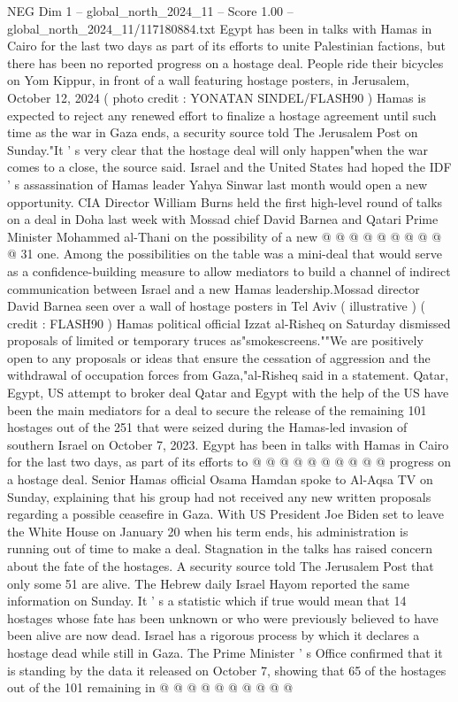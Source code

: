 \begin{textsample}{NEG Dim 1 – global\_north\_2024\_11 – Score 1.00 – global\_north\_2024\_11/117180884.txt}  \label{ex:f1_neg_112}
Egypt has been in talks with Hamas in Cairo for the last two days as part of its efforts to unite Palestinian factions, but there has been no reported progress on a hostage deal.
People ride their bicycles on Yom Kippur, in front of a wall featuring hostage posters, in Jerusalem, October 12, 2024 ( photo credit : YONATAN SINDEL/FLASH90 ) Hamas is expected to reject any renewed effort to finalize a hostage agreement until such time as the war in Gaza ends, a security source told The Jerusalem Post on Sunday."It ' s very clear that the hostage deal will only happen"when the war comes to a close, the source said.
Israel and the United States had hoped the IDF ' s assassination of Hamas leader Yahya Sinwar last month would open a new opportunity.
CIA Director William Burns held the first high-level round of talks on a deal in Doha last week with Mossad chief David Barnea and Qatari Prime Minister Mohammed al-Thani on the possibility of a new @ @ @ @ @ @ @ @ @ @ 31 one.
Among the possibilities on the table was a mini-deal that would serve as a confidence-building measure to allow mediators to build a channel of indirect communication between Israel and a new Hamas leadership.Mossad director David Barnea seen over a wall of hostage posters in Tel Aviv ( illustrative ) ( credit : FLASH90 ) Hamas political official Izzat al-Risheq on Saturday dismissed proposals of limited or temporary truces as"smokescreens.""We are positively open to any proposals or ideas that ensure the cessation of aggression and the withdrawal of occupation forces from Gaza,"al-Risheq said in a statement.
Qatar, Egypt, US attempt to broker deal Qatar and Egypt with the help of the US have been the main mediators for a deal to secure the release of the remaining 101 hostages out of the 251 that were seized during the Hamas-led invasion of southern Israel on October 7, 2023.
Egypt has been in talks with Hamas in Cairo for the last two days, as part of its efforts to @ @ @ @ @ @ @ @ @ @ progress on a hostage deal.
Senior Hamas official Osama Hamdan spoke to Al-Aqsa TV on Sunday, explaining that his group had not received any new written proposals regarding a possible ceasefire in Gaza.
With US President Joe Biden set to leave the White House on January 20 when his term ends, his administration is running out of time to make a deal.
Stagnation in the talks has raised concern about the fate of the hostages.
A security source told The Jerusalem Post that only some 51 are alive.
The Hebrew daily Israel Hayom reported the same information on Sunday.
It ' s a statistic which if true would mean that 14 hostages whose fate has been unknown or who were previously believed to have been alive are now dead.
Israel has a rigorous process by which it declares a hostage dead while still in Gaza.
The Prime Minister ' s Office confirmed that it is standing by the data it released on October 7, showing that 65 of the hostages out of the 101 remaining in @ @ @ @ @ @ @ @ @ @

\end{textsample}
